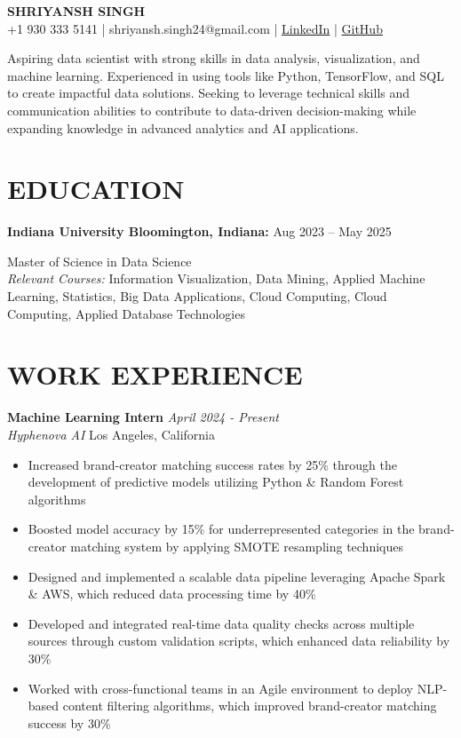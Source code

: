 \documentclass[11pt,a4paper]{article}
\newcommand{\cvitem}[2]{
  \textbf{#1:} #2\par
}
\newcommand{\workexp}[4]{
  \textbf{#1} \hfill \textit{#2}\\
  \textit{#3} \hfill #4\\
}
\begin{document}
\begin{center}
\textbf{\Large SHRIYANSH SINGH}\\
\small
+1 930 333 5141 | shriyansh.singh24@gmail.com | \href{https://www.linkedin.com/in/shriyansh-bir-singh}{LinkedIn} | \href{https://github.com/shriyansh24}{GitHub}
\end{center}

\small{Aspiring data scientist with strong skills in data analysis, visualization, and machine learning. Experienced in using tools like Python, TensorFlow, and SQL to create impactful data solutions. Seeking to leverage technical skills and communication abilities to contribute to data-driven decision-making while expanding knowledge in advanced analytics and AI applications.}

\section*{EDUCATION}
\cvitem{Indiana University Bloomington, Indiana}{Aug 2023 – May 2025}
Master of Science in Data Science\\
\textit{Relevant Courses:} Information Visualization, Data Mining, Applied Machine Learning, Statistics, Big Data Applications, Cloud Computing, Cloud Computing, Applied Database Technologies


\section*{WORK EXPERIENCE}
\workexp{Machine Learning Intern}{April 2024 - Present}{Hyphenova AI}{Los Angeles, California}
\begin{itemize}[leftmargin=*,noitemsep,topsep=0pt]
\item Increased brand-creator matching success rates by 25\% through the development of predictive models utilizing Python \& Random Forest algorithms
\item Boosted model accuracy by 15\% for underrepresented categories in the brand-creator matching system by applying SMOTE resampling techniques
\item Designed and implemented a scalable data pipeline leveraging Apache Spark \& AWS, which reduced data processing time by 40\%
\item Developed and integrated real-time data quality checks across multiple sources through custom validation scripts, which enhanced data reliability by 30\%
\item Worked with cross-functional teams in an Agile environment to deploy NLP-based content filtering algorithms, which improved brand-creator matching success by 30\%
\end{itemize}
\end{document}
